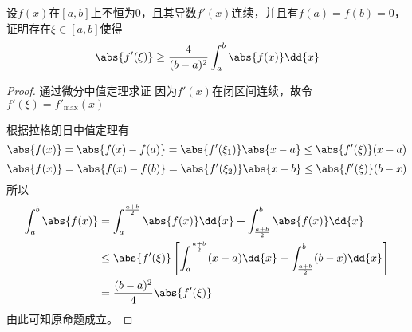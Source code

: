 \begin{example}
    设$f(x)$在$[a,b]$上不恒为$0$，且其导数$f'(x)$连续，并且有$f(a)=f(b)=0$，证明存在$\xi\in[a,b]$使得
    \[ \abs{f'(\xi)} \geq \frac{4}{(b-a)^2} \int_a^b\abs{f(x)}\dd{x} \]
\end{example}
\begin{proof}
    通过微分中值定理求证
    因为$f'(x)$在闭区间连续，故令$f'(\xi) = f'_{\max}(x)$

    根据拉格朗日中值定理有
    \[ \abs{f(x)} = \abs{f(x)-f(a)} = \abs{f'(\xi_1)}\abs{x-a} \leq \abs{f'(\xi)}(x-a) \]
    \[ \abs{f(x)} = \abs{f(x)-f(b)} = \abs{f'(\xi_2)}\abs{x-b} \leq \abs{f'(\xi)}(b-x) \]
    所以
    \begin{align*}
        \int_a^b\abs{f(x)} & = \int_a^{\frac{a+b}{2}} \abs{f(x)}\dd{x} + \int_{\frac{a+b}{2}}^b \abs{f(x)}\dd{x}                      \\
                           & \leq \abs{f'(\xi)}\left[ \int_a^{\frac{a+b}{2}} (x-a)\dd{x} + \int_{\frac{a+b}{2}}^b (b-x)\dd{x} \right] \\
                           & = \frac{(b-a)^2}{4}\abs{f'(\xi)}
    \end{align*}
    由此可知原命题成立。
\end{proof}

